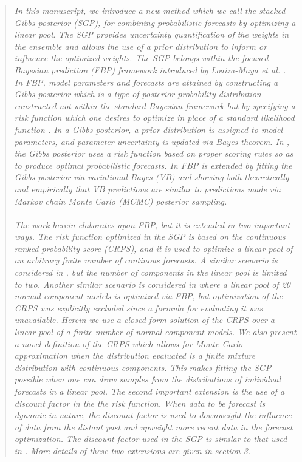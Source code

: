\documentclass[ba]{imsart}
\newcommand{\1}[1]{\mathds{1}\left[#1\right]}
\begin{document}
\begin{quote}
  \emph{In this manuscript, we introduce a new method which we call the stacked 
  Gibbs posterior (SGP), for combining probabilistic forecasts by optimizing a 
  linear pool. The SGP provides uncertainty quantification of the weights in 
  the ensemble and allows the use of a prior distribution to inform or 
  influence the optimized weights. 
  The SGP belongs within the \textit{focused Bayesian prediction} (FBP) framework
  introduced by Loaiza-Maya et al. \cite[]{loaiza2021focused}. 
  In FBP, model parameters and forecasts are attained by constructing a Gibbs 
  posterior which is a type of posterior probability distribution constructed 
  not within the standard Bayesian framework but by specifying a risk function 
  which one desires to optimize in place of a standard likelihood function 
  \cite[]{martin2022direct,bissiri2016general}. In a Gibbs posterior, a prior
  distribution is assigned to model parameters, and parameter uncertainty is
  updated via Bayes theorem. In \cite[]{loaiza2021focused}, the Gibbs posterior
  uses a risk function based on proper scoring rules so as to produce optimal
  probabilistic 
  forecasts. In \cite[]{frazier2025loss} FBP is extended by fitting
  the Gibbs posterior via variational Bayes (VB)
  and showing both theoretically and 
  empirically that VB predictions are similar to predictions made via Markov
  chain Monte Carlo (MCMC) posterior sampling.}
  \\~\\
  \emph{
  The work herein elaborates upon FBP, but it is extended in two important ways.
  The risk function optimized in the SGP is based on the continuous ranked 
  probability score (CRPS), and it is used to optimize a linear pool of 
  an arbitrary finite number of continous forecasts. 
  A similar scenario is considered in \cite[]{loaiza2021focused}, 
  but the number of components in the 
  linear pool is limited to two. Another similar scenario is considered in
  \cite[]{frazier2025loss} where a linear pool of 20 normal component models is
  optimized via FBP, but optimization of the CRPS was explicitly excluded 
  since a formula for evaluating it was unavailable. 
  Herein we use a closed form
  solution of the CRPS over a linear pool of a finite number of normal component
  models. We also present a novel definition of the CRPS which allows for
  Monte Carlo approximation when the distribution evaluated is a finite mixture
  distribution with continuous components. This makes fitting the SGP possible
  when one can draw samples from the distributions of individual forecasts
  in a linear pool.
  The second important extension is the use of a discount factor in the the risk
  function. When data to be forecast is dynamic in nature, the discount factor
  is used to downweight the influence of data from the distant past and 
  upweight more recent data in the forecast optimization. The discount factor
  used in the SGP is similar to that used in 
  \cite[]{bernaciak2024loss,koop2013large, raftery2010online}.
  More details of these two extensions are given in section 3.}
\end{quote}
\end{document}
